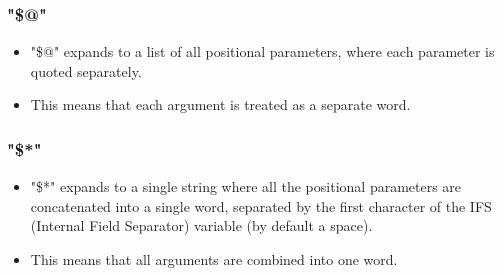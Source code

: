 \documentclass{report}
\begin{document}
    \subsubsection{"\$@"}
    \begin{itemize}
        \item "\$@" expands to a list of all positional parameters, where each parameter is quoted separately.
        \item This means that each argument is treated as a separate word.
    \end{itemize}
    \bigbreak \noindent 
    \subsubsection{"\$*"}
    \begin{itemize}
        \item "\$*" expands to a single string where all the positional parameters are concatenated into a single word, separated by the first character of the IFS (Internal Field Separator) variable (by default a space).
        \item This means that all arguments are combined into one word.
    \end{itemize}
\end{document}
